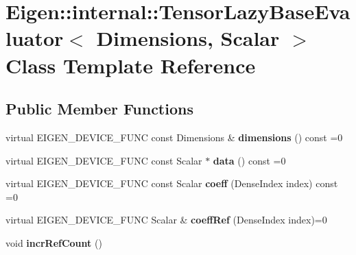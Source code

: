 \hypertarget{class_eigen_1_1internal_1_1_tensor_lazy_base_evaluator}{}\section{Eigen\+:\+:internal\+:\+:Tensor\+Lazy\+Base\+Evaluator$<$ Dimensions, Scalar $>$ Class Template Reference}
\label{class_eigen_1_1internal_1_1_tensor_lazy_base_evaluator}
\subsection*{Public Member Functions}
\begin{DoxyCompactItemize}
\item 
\mbox{\label{class_eigen_1_1internal_1_1_tensor_lazy_base_evaluator_a79a186979ef9cbac21f920ba11f4bd17}} 
virtual E\+I\+G\+E\+N\+\_\+\+D\+E\+V\+I\+C\+E\+\_\+\+F\+U\+NC const Dimensions \& {\bfseries dimensions} () const =0
\item 
\mbox{\label{class_eigen_1_1internal_1_1_tensor_lazy_base_evaluator_aefdf12bef4c491de42ba4b43fcf49cfd}} 
virtual E\+I\+G\+E\+N\+\_\+\+D\+E\+V\+I\+C\+E\+\_\+\+F\+U\+NC const Scalar $\ast$ {\bfseries data} () const =0
\item 
\mbox{\label{class_eigen_1_1internal_1_1_tensor_lazy_base_evaluator_a6bccdf2ae168f8eba0f3a18ff1b0c8e2}} 
virtual E\+I\+G\+E\+N\+\_\+\+D\+E\+V\+I\+C\+E\+\_\+\+F\+U\+NC const Scalar {\bfseries coeff} (Dense\+Index index) const =0
\item 
\mbox{\label{class_eigen_1_1internal_1_1_tensor_lazy_base_evaluator_ad03a2eb2419ff9ddae9be04d0228c4d6}} 
virtual E\+I\+G\+E\+N\+\_\+\+D\+E\+V\+I\+C\+E\+\_\+\+F\+U\+NC Scalar \& {\bfseries coeff\+Ref} (Dense\+Index index)=0
\item 
\mbox{\label{class_eigen_1_1internal_1_1_tensor_lazy_base_evaluator_aa61ea5c3d4f5e5fc3a9442527423fe61}} 
void {\bfseries incr\+Ref\+Count} ()

\end{DoxyCompactItemize}
